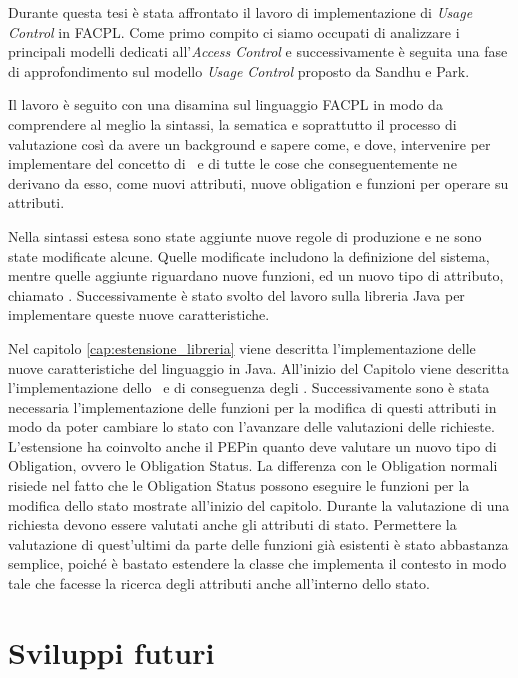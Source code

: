 \label{cap:conclusioni}
Durante questa tesi è stata affrontato il lavoro di implementazione di \textit{Usage Control} in \ac{FACPL}.
Come primo compito ci siamo occupati di analizzare i principali modelli dedicati all'\textit{Access Control} e successivamente è seguita una fase di approfondimento sul modello \textit{Usage Control} proposto da Sandhu e Park. \\ \par
Il lavoro è seguito con una disamina sul linguaggio \ac{FACPL} in modo da comprendere al meglio la sintassi, la sematica e soprattutto il processo di valutazione così da avere un background e sapere come, e dove, intervenire per implementare del concetto di \status \ e di tutte le cose che conseguentemente ne derivano da esso, come nuovi attributi, nuove obligation e funzioni per operare su attributi.\\ \par
Nella sintassi estesa sono state aggiunte nuove regole di produzione e ne sono state modificate alcune. Quelle modificate includono la definizione del sistema, mentre quelle aggiunte riguardano nuove funzioni, ed un nuovo tipo di attributo, chiamato \statusattribute.
Successivamente è stato svolto del lavoro sulla libreria Java per implementare queste nuove caratteristiche. \par
Nel capitolo \ref{cap:estensione_libreria} viene descritta l'implementazione delle nuove caratteristiche del linguaggio in Java. All'inizio del Capitolo viene descritta l'implementazione dello \status \ e di conseguenza degli \statusattribute. Successivamente sono è stata necessaria  l'implementazione  delle funzioni per la modifica di questi attributi in modo da poter cambiare lo stato con l'avanzare delle valutazioni delle richieste. L'estensione ha coinvolto anche il \ac{PEP}in quanto deve valutare un nuovo tipo di Obligation, ovvero le Obligation Status.
La differenza con le Obligation normali risiede nel fatto che le Obligation Status possono eseguire le funzioni per la modifica dello stato mostrate all'inizio del capitolo.
Durante la valutazione di una richiesta devono essere valutati anche gli attributi di stato. Permettere la valutazione di quest'ultimi da parte delle funzioni già esistenti è stato abbastanza semplice, poiché è bastato estendere la classe che implementa il contesto in modo tale che facesse la ricerca degli attributi anche all'interno dello stato.

\section{Sviluppi futuri}
\label{sec:futuro}

